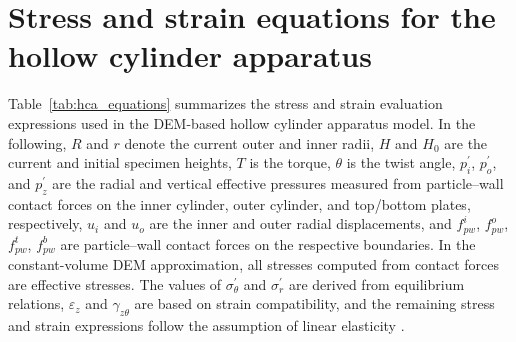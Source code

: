 \section{Stress and strain equations for the hollow cylinder apparatus}
\label{sec:appendix_hca}

Table~\ref{tab:hca_equations} summarizes the stress and strain evaluation expressions used in the DEM-based hollow cylinder apparatus model. In the following, $R$ and $r$ denote the current outer and inner radii, $H$ and $H_0$ are the current and initial specimen heights, $T$ is the torque, $\theta$ is the twist angle, $p_i^{\prime}$, $p_o^{\prime}$, and $p_z^{\prime}$ are the radial and vertical effective pressures measured from particle--wall contact forces on the inner cylinder, outer cylinder, and top/bottom plates, respectively, $u_i$ and $u_o$ are the inner and outer radial displacements, and $f_{pw}^{i}$, $f_{pw}^{o}$, $f_{pw}^{t}$, $f_{pw}^{b}$ are particle--wall contact forces on the respective boundaries. In the constant-volume DEM approximation, all stresses computed from contact forces are effective stresses. The values of $\sigma_\theta^{\prime}$ and $\sigma_r^{\prime}$ are derived from equilibrium relations, $\varepsilon_z$ and $\gamma_{z\theta}$ are based on strain compatibility, and the remaining stress and strain expressions follow the assumption of linear elasticity \citep{Hight1983}.

